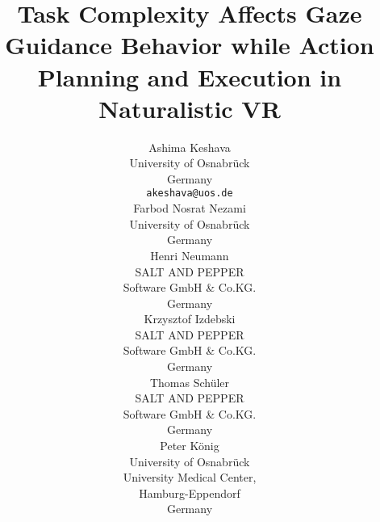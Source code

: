 \documentclass{article}
\begin{document}
\title{Task Complexity Affects Gaze Guidance Behavior while Action Planning and Execution in Naturalistic VR}
\author{
  Ashima Keshava\\
  University of Osnabr{\"u}ck\\
  Germany\\
  \texttt{akeshava@uos.de} \\
   \And
   Farbod Nosrat Nezami\\
  University of Osnabr{\"u}ck\\
  Germany
  
   \And
   Henri Neumann\\
  SALT AND PEPPER \\ Software GmbH \& Co.KG.\\
  Germany\\
   \And
  Krzysztof Izdebski\\
  SALT AND PEPPER \\ Software GmbH \& Co.KG.\\
  Germany\\
   \And
   Thomas Sch{\"u}ler\\
  SALT AND PEPPER \\ Software GmbH \& Co.KG.\\
  Germany\\
   \And
   Peter K{\"o}nig\\
   University of Osnabr{\"u}ck\\
   University Medical Center,\\ Hamburg-Eppendorf\\
   Germany
}

\maketitle

\begin{abstract}

\end{abstract}


\captionsetup[figure]{font=scriptsize,labelfont=bf}






% 
\end{document}
